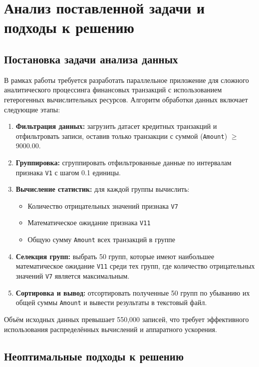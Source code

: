 \documentclass[areaset=advanced]{scrartcl}
\begin{document}
\newpage
\section{Анализ поставленной задачи и подходы к решению}

\subsection{Постановка задачи анализа данных}

В рамках работы требуется разработать параллельное приложение для сложного аналитического процессинга финансовых транзакций с использованием гетерогенных вычислительных ресурсов. Алгоритм обработки данных включает следующие этапы:

\begin{enumerate}
    \item \textbf{Фильтрация данных:} загрузить датасет кредитных транзакций и отфильтровать записи, оставив только транзакции с суммой (\texttt{Amount}) $\geq$ 9000.00.
    \item \textbf{Группировка:} сгруппировать отфильтрованные данные по интервалам признака \texttt{V1} с шагом 0.1 единицы.
    \item \textbf{Вычисление статистик:} для каждой группы вычислить:
    \begin{itemize}
        \item Количество отрицательных значений признака \texttt{V7}
        \item Математическое ожидание признака \texttt{V11}
        \item Общую сумму \texttt{Amount} всех транзакций в группе
    \end{itemize}
    \item \textbf{Селекция групп:} выбрать 50 групп, которые имеют наибольшее математическое ожидание \texttt{V11} среди тех групп, где количество отрицательных значений \texttt{V7} является максимальным.
    \item \textbf{Сортировка и вывод:} отсортировать полученные 50 групп по убыванию их общей суммы \texttt{Amount} и вывести результаты в текстовый файл.
\end{enumerate}

Объём исходных данных превышает 550,000 записей, что требует эффективного использования распределённых вычислений и аппаратного ускорения.

\subsection{Неоптимальные подходы к решению}
\end{document}
